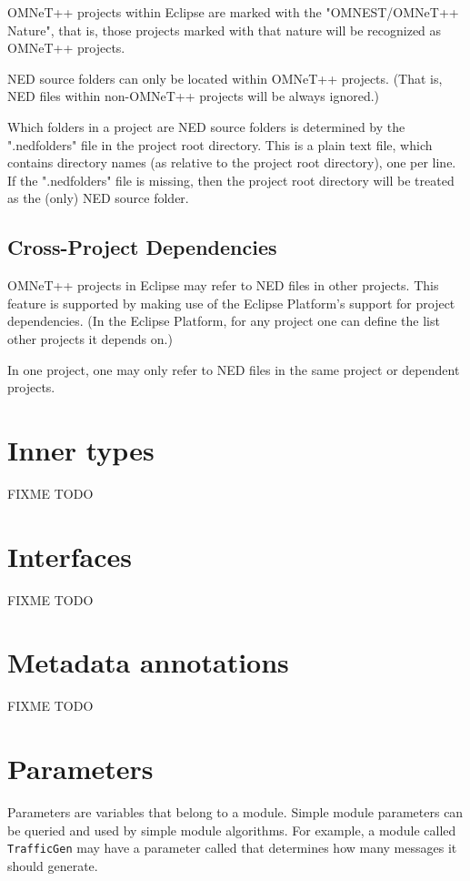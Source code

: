 OMNeT++ projects within Eclipse are marked with the "OMNEST/OMNeT++ Nature",
that is, those projects marked with that nature will be recognized as
OMNeT++ projects.

NED source folders can only be located within OMNeT++ projects. (That is,
NED files within non-OMNeT++ projects will be always ignored.)

Which folders in a project are NED source folders is determined by
the ".nedfolders" file in the project root directory. This is a plain
text file, which contains directory names (as relative to the
project root directory), one per line. If the ".nedfolders" file is
missing, then the project root directory will be treated as the (only)
NED source folder.


\subsection{Cross-Project Dependencies}

OMNeT++ projects in Eclipse may refer to NED files in other projects.
This feature is supported by making use of the Eclipse Platform's
support for project dependencies. (In the Eclipse Platform, for any
project one can define the list other projects it depends on.)

In one project, one may only refer to NED files in the same project
or dependent projects.


\section{Inner types}
FIXME TODO

\section{Interfaces}
FIXME TODO

\section{Metadata annotations}
FIXME TODO


\section{Parameters}
\label{sec:ch-ned-lang:simple-module-param}


Parameters are variables that belong to a module. Simple module
parameters can be queried and used by simple module algorithms.
For example, a module called \texttt{TrafficGen} may have a parameter
called  that determines how many messages it
should generate.

